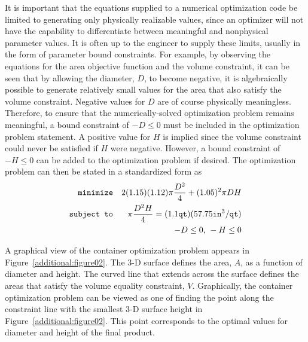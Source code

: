 It is important that the equations supplied to a numerical
optimization code be limited to generating only physically realizable
values, since an optimizer will not have the capability to
differentiate between meaningful and nonphysical parameter values. It
is often up to the engineer to supply these limits, usually in the
form of parameter bound constraints. For example, by observing the
equations for the area objective function and the volume constraint,
it can be seen that by allowing the diameter, $D$, to become negative,
it is algebraically possible to generate relatively small values for
the area that also satisfy the volume constraint. Negative values for
$D$ are of course physically meaningless. Therefore, to ensure that
the numerically-solved optimization problem remains meaningful, a
bound constraint of $-D \leq 0$ must be included in the optimization
problem statement. A positive value for $H$ is implied since the
volume constraint could never be satisfied if $H$ were negative.
However, a bound constraint of $-H \leq 0$ can be added to the
optimization problem if desired. The optimization problem can then be
stated in a standardized form as
\begin{eqnarray}
\texttt{minimize}   & & 2(1.15)(1.12)\pi\frac{D^2}{4}+(1.05)^2\pi DH\nonumber\\
\texttt{subject to} & & \pi\frac{D^2H}{4}=
  (1.1\mathtt{qt})(57.75 \mathtt{in}^3/\mathtt{qt}) \label{additional:contFH}\\
                    & & -D \leq 0\hbox{, }-H \leq 0\nonumber
\end{eqnarray}

A graphical view of the container optimization problem appears in
Figure~\ref{additional:figure02}. The 3-D surface defines the area,
$A$, as a function of diameter and height. The curved line that
extends across the surface defines the areas that satisfy the volume
equality constraint, $V$. Graphically, the container optimization
problem can be viewed as one of finding the point along the constraint
line with the smallest 3-D surface height in
Figure~\ref{additional:figure02}. This point corresponds to the
optimal values for diameter and height of the final product.

